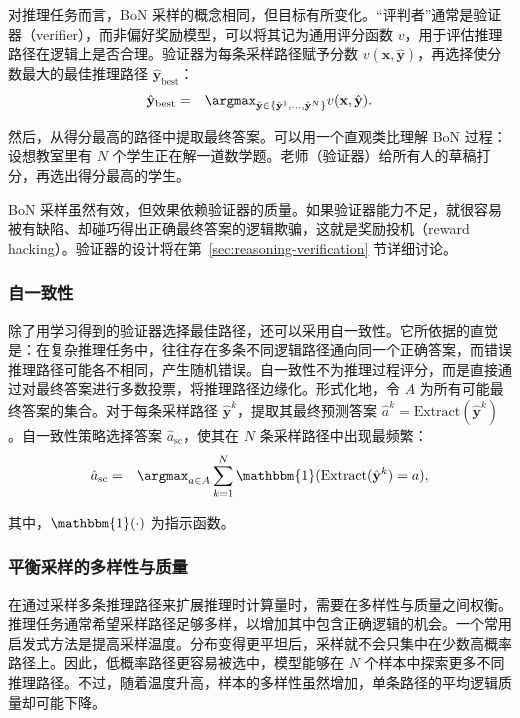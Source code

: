 对推理任务而言，BoN 采样的概念相同，但目标有所变化。“评判者”通常是验证器（verifier），而非偏好奖励模型，可以将其记为通用评分函数 $v$，用于评估推理路径在逻辑上是否合理。验证器为每条采样路径赋予分数 $v(\mathbf{x}, \hat{\mathbf{y}})$，再选择使分数最大的最佳推理路径 $\hat{\mathbf{y}}_{\mathrm{best}}$：
\begin{eqnarray}
\hat{\mathbf{y}}_{\mathrm{best}} & = & \argmax_{\hat{\mathbf{y}} \in \{\hat{\mathbf{y}}^1, \dots, \hat{\mathbf{y}}^N\}} v(\mathbf{x}, \hat{\mathbf{y}}).
\end{eqnarray}

\noindent 然后，从得分最高的路径中提取最终答案。可以用一个直观类比理解 BoN 过程：设想教室里有 $N$ 个学生正在解一道数学题。老师（验证器）给所有人的草稿打分，再选出得分最高的学生。

BoN 采样虽然有效，但效果依赖验证器的质量。如果验证器能力不足，就很容易被有缺陷、却碰巧得出正确最终答案的逻辑欺骗，这就是奖励投机（reward hacking）。验证器的设计将在第~\ref{sec:reasoning-verification} 节详细讨论。

\subsubsection{自一致性}
除了用学习得到的验证器选择最佳路径，还可以采用自一致性。它所依据的直觉是：在复杂推理任务中，往往存在多条不同逻辑路径通向同一个正确答案，而错误推理路径可能各不相同，产生随机错误。自一致性不为推理过程评分，而是直接通过对最终答案进行多数投票，将推理路径边缘化。形式化地，令 $A$ 为所有可能最终答案的集合。对于每条采样路径 $\hat{\mathbf{y}}^k$，提取其最终预测答案 $\hat{a}^k = \mathrm{Extract}(\hat{\mathbf{y}}^k)$。自一致性策略选择答案 $\hat{a}_{\mathrm{sc}}$，使其在 $N$ 条采样路径中出现最频繁：
\begin{eqnarray}
\hat{a}_{\mathrm{sc}} & = & \argmax_{a \in A} \sum_{k=1}^N \mathbbm{1}(\mathrm{Extract}(\hat{\mathbf{y}}^k) = a),
\end{eqnarray}

\noindent 其中，$\mathbbm{1}(\cdot)$ 为指示函数。

\subsubsection{平衡采样的多样性与质量}

在通过采样多条推理路径来扩展推理时计算量时，需要在多样性与质量之间权衡。推理任务通常希望采样路径足够多样，以增加其中包含正确逻辑的机会。一个常用启发式方法是提高采样温度。分布变得更平坦后，采样就不会只集中在少数高概率路径上。因此，低概率路径更容易被选中，模型能够在 $N$ 个样本中探索更多不同推理路径。不过，随着温度升高，样本的多样性虽然增加，单条路径的平均逻辑质量却可能下降。

